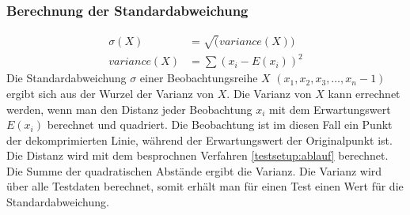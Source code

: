 \subsubsection{Berechnung der Standardabweichung}
\begin{equation} \label{testsetup:ablauf:formula:deviation}
	\begin{split}
		\sigma(X)& = \sqrt(variance(X))\\
		variance(X) & = \sum{(x_i - E(x_i))^2}
	\end{split}
\end{equation}
Die Standardabweichung $\sigma$ einer Beobachtungsreihe $X$ $(x_1,x_2,x_3,\ldots, x_n-1)$ ergibt sich aus der Wurzel der Varianz von $X$. Die Varianz von $X$ kann errechnet werden, wenn man den Distanz jeder Beobachtung $x_i$ mit dem Erwartungswert $E(x_i)$ berechnet und quadriert. Die Beobachtung ist im diesen Fall ein Punkt der dekomprimierten Linie, während der Erwartungswert der Originalpunkt ist. Die Distanz wird mit dem besprochnen Verfahren \ref{testsetup:ablauf} berechnet. Die Summe der quadratischen Abstände ergibt die Varianz. Die Varianz wird über alle Testdaten berechnet, somit erhält man für einen Test einen Wert für die Standardabweichung.

